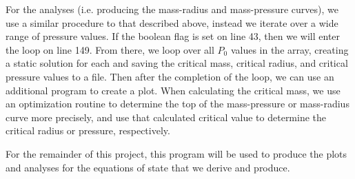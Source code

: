 For the analyses (i.e. producing the mass-radius and mass-pressure curves), we use a similar procedure to that described above, instead we iterate over a wide range of pressure values. If the boolean flag  is set on line 43, then we will enter the loop on line 149. From there, we loop over all $P_0$ values in the  array, creating a static solution for each and saving the critical mass, critical radius, and critical pressure values to a file. Then after the completion of the loop, we can use an additional program to create a plot. When calculating the critical mass, we use an optimization routine to determine the top of the mass-pressure or mass-radius curve more precisely, and use that calculated critical value to determine the critical radius or pressure, respectively. 

For the remainder of this project, this program will be used to produce the plots and analyses for the equations of state that we derive and produce.

